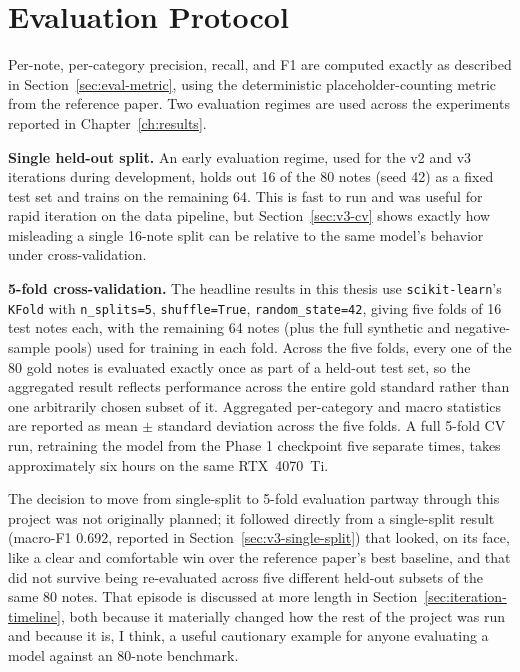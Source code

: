 \documentclass[12pt,a4paper]{report}
\begin{document}
\section{Evaluation Protocol}

Per-note, per-category precision, recall, and F1 are computed exactly as described in Section~\ref{sec:eval-metric}, using the deterministic placeholder-counting metric from the reference paper. Two evaluation regimes are used across the experiments reported in Chapter~\ref{ch:results}.

\textbf{Single held-out split.} An early evaluation regime, used for the v2 and v3 iterations during development, holds out 16 of the 80 notes (seed 42) as a fixed test set and trains on the remaining 64. This is fast to run and was useful for rapid iteration on the data pipeline, but Section~\ref{sec:v3-cv} shows exactly how misleading a single 16-note split can be relative to the same model's behavior under cross-validation.

\textbf{5-fold cross-validation.} The headline results in this thesis use \texttt{scikit-learn}'s \texttt{KFold} with \texttt{n\_splits=5}, \texttt{shuffle=True}, \texttt{random\_state=42}, giving five folds of 16 test notes each, with the remaining 64 notes (plus the full synthetic and negative-sample pools) used for training in each fold. Across the five folds, every one of the 80 gold notes is evaluated exactly once as part of a held-out test set, so the aggregated result reflects performance across the entire gold standard rather than one arbitrarily chosen subset of it. Aggregated per-category and macro statistics are reported as mean $\pm$ standard deviation across the five folds. A full 5-fold CV run, retraining the model from the Phase 1 checkpoint five separate times, takes approximately six hours on the same RTX~4070~Ti.

The decision to move from single-split to 5-fold evaluation partway through this project was not originally planned; it followed directly from a single-split result (macro-F1 0.692, reported in Section~\ref{sec:v3-single-split}) that looked, on its face, like a clear and comfortable win over the reference paper's best baseline, and that did not survive being re-evaluated across five different held-out subsets of the same 80 notes. That episode is discussed at more length in Section~\ref{sec:iteration-timeline}, both because it materially changed how the rest of the project was run and because it is, I think, a useful cautionary example for anyone evaluating a model against an 80-note benchmark.
\end{document}
